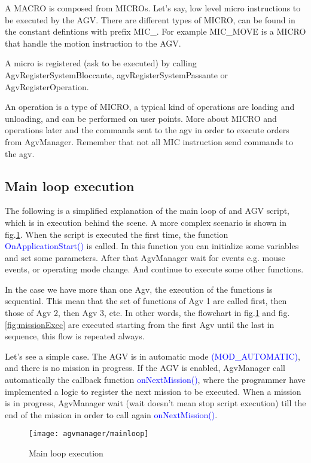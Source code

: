 A MACRO is composed from MICROs. Let's say, low level micro instructions to be executed by the AGV. There are different types of MICRO, can be found in the constant defintions with prefix MIC\_. For example MIC\_MOVE is a MICRO that handle the motion instruction to the AGV.

A micro is registered (ask to be executed) by calling AgvRegisterSystemBloccante, agvRegisterSystemPassante or AgvRegisterOperation.

An operation is a type of MICRO, a typical kind of operations are loading and unloading, and can be performed on user points.
More about MICRO and operations later and the commands sent to the agv in order to execute orders from AgvManager. Remember that not all MIC instruction send commands to the agv. 

\subsection{Main loop execution}
The following is a simplified explanation of the main loop of and AGV script, which is in execution behind the scene. A more complex scenario is shown in fig.\ref{fig:mainLoop}.
When the script is executed the first time, the function \textcolor{blue}{OnApplicationStart()} is called. In this function you can initialize some variables and set some parameters. After that AgvManager wait for events e.g. mouse events, or operating mode change. And continue to execute some other functions.

In the case we have more than one Agv, the execution of the functions is sequential. This mean that the set of functions of Agv 1 are called first, then those of Agv 2, then Agv 3, etc. In other words, the flowchart in fig.\ref{fig:mainLoop} and fig.\ref{fig:missionExec} are executed starting from the first Agv until the last in sequence, this flow is repeated always.

Let's see a simple case. The AGV is in automatic mode \textcolor{blue}{(MOD\_AUTOMATIC)}, and there is no mission in progress. If the AGV is enabled, AgvManager call automatically the callback function \textcolor{blue}{onNextMission()}, where the programmer have implemented a logic to register the next mission to be executed. When a mission is in progress, AgvManager wait (wait doesn't mean stop script execution) till the end of the mission in order to call again \textcolor{blue}{onNextMission()}.

\begin{figure}
	\centering\texttt{[image: agvmanager/mainloop]}
	\caption{Main loop execution}
	\label{fig:mainLoop}
\end{figure}

